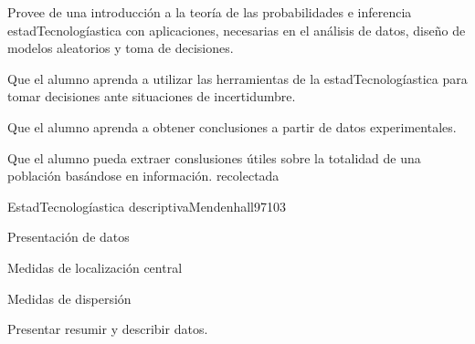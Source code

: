 
\begin{syllabus}


\begin{justification}
Provee de una introducción a la teoría de las probabilidades e inferencia estadTecnologíastica con aplicaciones, necesarias en el análisis de datos, diseño de modelos aleatorios y toma de decisiones.
\end{justification}

\begin{goals}
\item Que el alumno aprenda a utilizar las herramientas de la estadTecnologíastica para tomar decisiones ante situaciones de incertidumbre.
\item Que el alumno aprenda a obtener conclusiones a partir de datos experimentales.
\item Que el alumno pueda extraer conslusiones útiles sobre la totalidad de una población basándose en información. recolectada
\end{goals}

\begin{outcomes}
\end{outcomes}

\begin{unit}{EstadTecnologíastica descriptiva}{Mendenhall97}{10}{3}
\begin{topics}
      \item Presentación de datos
      \item Medidas de localización central
      \item Medidas de dispersión
   \end{topics}

   \begin{unitgoals}
      \item Presentar resumir y describir datos.
   \end{unitgoals}
\end{unit}


\end{syllabus}

